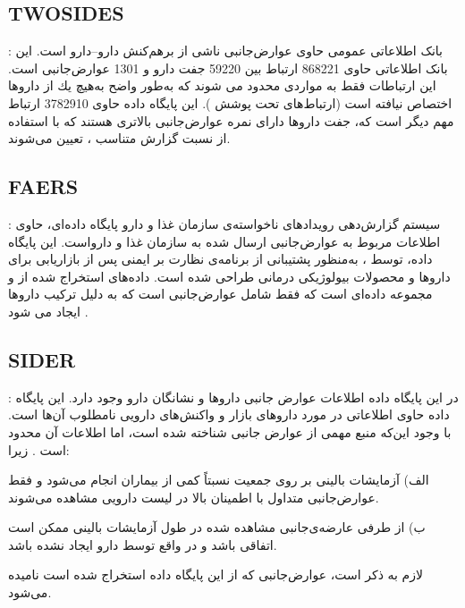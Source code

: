 \subsection{TWOSIDES}

\cite{Tatonetti2012}:
بانک اطلاعاتی عمومی حاوی عوارض‌جانبی ناشی از برهم‌کنش دارو–دارو  است. این بانک اطلاعاتی حاوی 868221 ارتباط بین 59220 جفت دارو و 1301 عوارض‌جانبی است. این ارتباطات فقط به مواردی محدود می شوند كه به‌طور واضح به‌هیچ یك از داروها اختصاص نیافته است (ارتباط‌های تحت پوشش
).
این پایگاه داده حاوی 3782910 ارتباط مهم دیگر است که، جفت داروها دارای نمره عوارض‌جانبی بالاتری هستند که با استفاده از نسبت گزارش متناسب 
،
تعیین می‌شوند.

\subsection{FAERS}

 :
سیستم گزارش‌دهی رویدادهای ناخواسته‌ی سازمان غذا و دارو پایگاه داده‌ای، حاوی اطلاعات مربوط به عوارض‌جانبی ارسال شده به سازمان غذا و دارواست. این پایگاه داده، توسط
،
به‌منظور پشتیبانی از برنامه‌ی نظارت بر ایمنی پس از بازاریابی برای داروها و محصولات بیولوژیکی درمانی طراحی شده است. داده‌های استخراج شده از 
 و 
مجموعه داده‌ای است که فقط شامل عوارض‌جانبی است که به دلیل ترکیب داروها ایجاد می شود 
\cite{Zhang2015}.

\subsection{SIDER}

\cite{kuhn2015sider}:
در این پایگاه داده اطلاعات عوارض جانبی دارو‌ها و نشانگان دارو وجود‌ دارد. این پایگاه داده حاوی اطلاعاتی در مورد داروهای بازار و واکنش‌های دارویی نامطلوب آن‌ها است. با وجود این‌که
منبع مهمی از عوارض جانبی شناخته شده است، اما اطلاعات آن محدود است
\cite{Zhang2015}.
زیرا:

الف) آزمایشات بالینی بر روی جمعیت نسبتاً کمی از بیماران انجام می‌شود و فقط عوارض‌جانبی متداول با اطمینان بالا در لیست دارویی مشاهده می‌شوند.

ب) از طرفی عارضه‌ی‌جانبی مشاهده ‌شده در طول آزمایشات بالینی ممکن است اتفاقی باشد و در واقع توسط دارو ایجاد نشده باشد. 

لازم به ذکر است، عوارض‌جانبی‌ که از این پایگاه ‌داده استخراج شده ‌است 
نامیده می‌شود.

